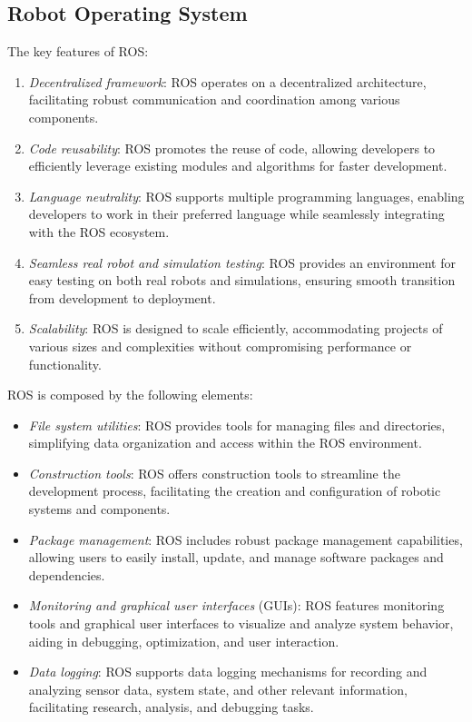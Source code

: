 \subsection{Robot Operating System}
The key features of ROS:
\begin{enumerate}
    \item \textit{Decentralized framework}: ROS operates on a decentralized architecture, facilitating robust communication and coordination among various components.
    \item \textit{Code reusability}: ROS promotes the reuse of code, allowing developers to efficiently leverage existing modules and algorithms for faster development.
    \item \textit{Language neutrality}: ROS supports multiple programming languages, enabling developers to work in their preferred language while seamlessly integrating with the ROS ecosystem.
    \item \textit{Seamless real robot and simulation testing}: ROS provides an environment for easy testing on both real robots and simulations, ensuring smooth transition from development to deployment.
    \item \textit{Scalability}: ROS is designed to scale efficiently, accommodating projects of various sizes and complexities without compromising performance or functionality.
\end{enumerate}
ROS is composed by the following elements: 
\begin{itemize}
    \item \textit{File system utilities}: ROS provides tools for managing files and directories, simplifying data organization and access within the ROS environment.
    \item \textit{Construction tools}: ROS offers construction tools to streamline the development process, facilitating the creation and configuration of robotic systems and components.
    \item \textit{Package management}: ROS includes robust package management capabilities, allowing users to easily install, update, and manage software packages and dependencies.
    \item \textit{Monitoring and graphical user interfaces} (GUIs): ROS features monitoring tools and graphical user interfaces to visualize and analyze system behavior, aiding in debugging, optimization, and user interaction.
    \item \textit{Data logging}: ROS supports data logging mechanisms for recording and analyzing sensor data, system state, and other relevant information, facilitating research, analysis, and debugging tasks.
\end{itemize}
